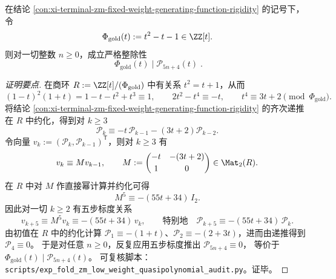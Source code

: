 \begin{conclusion}\label{con:xi-terminal-zm-fixed-weight-numerator-golden-factor}
在结论 \ref{con:xi-terminal-zm-fixed-weight-generating-function-rigidity} 的记号下，令
\[
\Phi_{\mathrm{gold}}(t):=t^2-t-1\in\ZZ[t].
\]
则对一切整数 \(n\ge 0\)，成立严格整除性
\[
\boxed{\;\Phi_{\mathrm{gold}}(t)\mid \mathcal{P}_{5n+4}(t)\; }.
\]
\end{conclusion}
\begin{proof}[证明要点]
在商环 \(R:=\ZZ[t]/(\Phi_{\mathrm{gold}})\) 中有关系 \(t^2=t+1\)，从而
\[
(1-t)^2(1+t)=1-t-t^2+t^3\equiv 1,\qquad
2t^2-t^4\equiv -t,\qquad
t^4\equiv 3t+2
\pmod{\Phi_{\mathrm{gold}}}.
\]
将结论 \ref{con:xi-terminal-zm-fixed-weight-generating-function-rigidity} 的齐次递推在 \(R\) 中约化，得到对 \(k\ge 3\)
\[
\mathcal{P}_k\equiv -t\,\mathcal{P}_{k-1}-(3t+2)\mathcal{P}_{k-2}.
\]
令向量 \(v_k:=(\mathcal{P}_k,\mathcal{P}_{k-1})^{\mathsf T}\)，则对 \(k\ge 3\) 有
\[
v_k\equiv M v_{k-1},\qquad
M:=\begin{pmatrix}-t&-(3t+2)\\[2pt]1&0\end{pmatrix}\in \Mat_{2}(R).
\]
在 \(R\) 中对 \(M\) 作直接幂计算并约化可得
\[
M^5\equiv -(55t+34)\,I_2.
\]
因此对一切 \(k\ge 2\) 有五步标度关系
\[
v_{k+5}\equiv M^5 v_k\equiv -(55t+34)\,v_k,
\qquad\text{特别地}\quad
\mathcal{P}_{k+5}\equiv -(55t+34)\,\mathcal{P}_k.
\]
由初值在 \(R\) 中的约化计算
\(
\mathcal{P}_1\equiv -(1+t)
\)、\(
\mathcal{P}_2\equiv -(2+3t)
\)，进而由递推得到 \(\mathcal{P}_4\equiv 0\)。
于是对任意 \(n\ge 0\)，反复应用五步标度推出 \(\mathcal{P}_{5n+4}\equiv 0\)，
等价于 \(\Phi_{\mathrm{gold}}(t)\mid \mathcal{P}_{5n+4}(t)\)。
可复核脚本：\texttt{scripts/exp\_fold\_zm\_low\_weight\_quasipolynomial\_audit.py}。证毕。
\end{proof}

